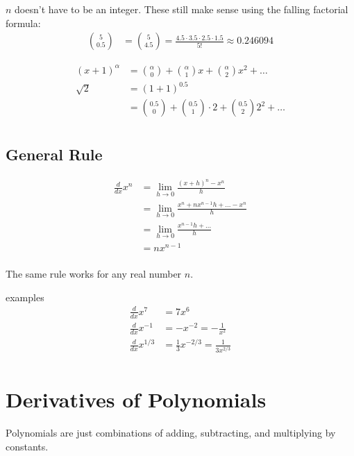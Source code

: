 \documentclass[letterpaper, portrait]{exam}
\begin{document}
  $n$ doesn't have to be an integer. These still make sense using the falling factorial formula:
  \begin{align*}
    \binom{5}{0.5} & = \binom{5}{4.5} = \frac{4.5 \cdot 3.5 \cdot 2.5 \cdot 1.5 }{5!} \approx 0.246094
  \end{align*}

  \begin{align*}
    (x + 1)^\alpha & = \binom{\alpha}{0} + \binom{\alpha}{1} x + \binom{\alpha}{2} x^2 + \dots \\
    \sqrt{2}       & = (1 + 1)^{0.5}  \\
                   & = \binom{0.5}{0} + \binom{0.5}{1} \cdot 2 + \binom{0.5}{2} 2^2 + \dots \\
  \end{align*}

  \subsection{General Rule} %
  \label{sub:gr}
  
  \begin{align*}
    \frac{d}{dx} x^n & = \lim_{h \to 0} \frac{(x + h)^n - x^n}{h} \\
                     & = \lim_{h \to 0} \frac{x^n + nx^{n - 1}h + \ldots - x^n}{h} \\
                     & = \lim_{h \to 0} \frac{x^{n - 1}h + \ldots}{h} \\
                     & = n x^{n-1} \\
  \end{align*}

  The same rule works for any real number $n$.

  examples
  \begin{align*}
    \frac{d}{dx} x^7     & = 7x^6 \\
    \frac{d}{dx} x^{-1}  & = -x^{-2} = - \frac{1}{x^2} \\
    \frac{d}{dx} x^{1/3} & = \frac{1}{3} x^{-2/3} = \frac{1}{3 x^{2/3}} \\
  \end{align*}

  \section{Derivatives of Polynomials} %
  
  Polynomials are just combinations of adding, subtracting, and multiplying by constants. 
  
\end{document}
